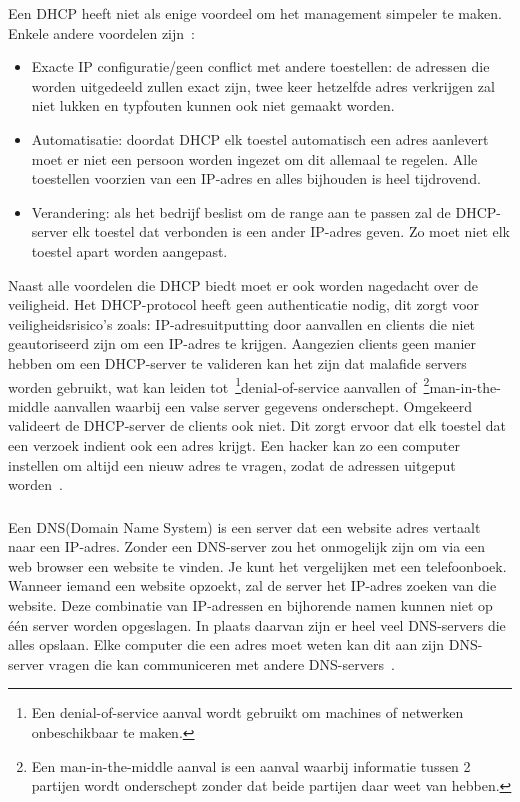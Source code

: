 Een DHCP heeft niet als enige voordeel om het management simpeler te maken. Enkele andere voordelen zijn~\autocite{Kerravala2018}:
\begin{itemize}
    \item Exacte IP configuratie/geen conflict met andere toestellen: de adressen die worden uitgedeeld zullen exact zijn, twee keer hetzelfde adres verkrijgen zal niet lukken en typfouten kunnen ook niet gemaakt worden.
    \item Automatisatie: doordat DHCP elk toestel automatisch een adres aanlevert moet er niet een persoon worden ingezet om dit allemaal te regelen. Alle toestellen voorzien van een IP-adres en alles bijhouden is heel tijdrovend. 
    \item Verandering: als het bedrijf beslist om de range aan te passen zal de DHCP-server elk toestel dat verbonden is een ander IP-adres geven. Zo moet niet elk toestel apart worden aangepast.
\end{itemize}

Naast alle voordelen die DHCP biedt moet er ook worden nagedacht over de veiligheid. Het DHCP-protocol heeft geen authenticatie nodig, dit zorgt voor veiligheidsrisico's zoals: IP-adresuitputting door aanvallen en clients die niet geautoriseerd zijn om een IP-adres te krijgen. Aangezien clients geen manier hebben om een DHCP-server te valideren kan het zijn dat malafide servers worden gebruikt, wat kan leiden tot~\footnote{Een denial-of-service aanval wordt gebruikt om machines of netwerken onbeschikbaar te maken.}denial-of-service aanvallen of~\footnote{Een man-in-the-middle aanval is een aanval waarbij informatie tussen 2 partijen wordt onderschept zonder dat beide partijen daar weet van hebben.}man-in-the-middle aanvallen waarbij een valse server gegevens onderschept. Omgekeerd valideert de DHCP-server de clients ook niet. Dit zorgt ervoor dat elk toestel dat een verzoek indient ook een adres krijgt. Een hacker kan zo een computer instellen om altijd een nieuw adres te vragen, zodat de adressen uitgeput worden~\autocite{Kerravala2018}.
\subsubsection{}
\label{subsubsec:DNS-server}
Een DNS(Domain Name System) is een server dat een website adres vertaalt naar een IP-adres. Zonder een DNS-server zou het onmogelijk zijn om via een web browser een website te vinden. Je kunt het vergelijken met een telefoonboek. Wanneer iemand een website opzoekt, zal de server het IP-adres zoeken van die website. Deze combinatie van IP-adressen en bijhorende namen kunnen niet op één server worden opgeslagen. In plaats daarvan zijn er heel veel DNS-servers die alles opslaan. Elke computer die een adres moet weten kan dit aan zijn DNS-server vragen die kan communiceren met andere DNS-servers~\autocite{Johnson2021}. 

